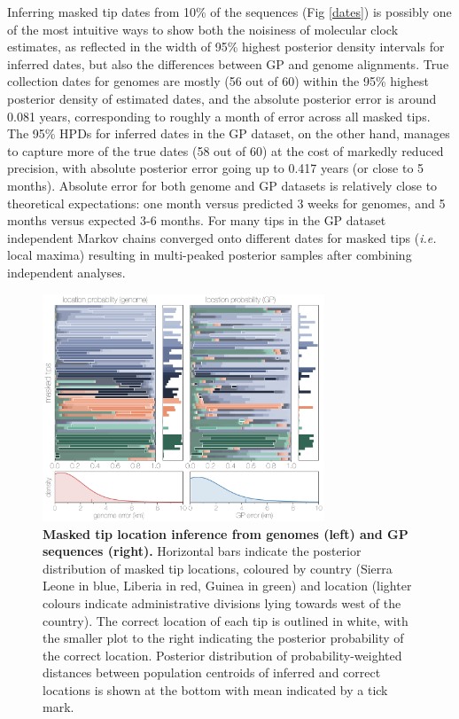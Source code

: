 \documentclass[11pt,oneside,letterpaper]{article}
\begin{document}
Inferring masked tip dates from 10\% of the sequences (Fig \ref{dates}) is possibly one of the most intuitive ways to show both the noisiness of molecular clock estimates, as reflected in the width of 95\% highest posterior density intervals for inferred dates, but also the differences between GP and genome alignments.
True collection dates for genomes are mostly (56 out of 60) within the 95\% highest posterior density of estimated dates, and the absolute posterior error is around 0.081 years, corresponding to roughly a month of error across all masked tips.
The 95\% HPDs for inferred dates in the GP dataset, on the other hand, manages to capture more of the true dates (58 out of 60) at the cost of markedly reduced precision, with absolute posterior error going up to 0.417 years (or close to 5 months).
Absolute error for both genome and GP datasets is relatively close to theoretical expectations: one month versus predicted 3 weeks for genomes, and 5 months versus expected 3-6 months.
For many tips in the GP dataset independent Markov chains converged onto different dates for masked tips (\textit{i.e.} local maxima) resulting in multi-peaked posterior samples after combining independent analyses.

\begin{figure}[h]
 \centering
	\includegraphics[width=0.75\textwidth]{figures/fig3_locations.png}
	\caption{\textbf{Masked tip location inference from genomes (left) and GP sequences (right).}
  Horizontal bars indicate the posterior distribution of masked tip locations, coloured by country (Sierra Leone in blue, Liberia in red, Guinea in green) and location (lighter colours indicate administrative divisions lying towards west of the country).
  The correct location of each tip is outlined in white, with the smaller plot to the right indicating the posterior probability of the correct location.
  Posterior distribution of probability-weighted distances between population centroids of inferred and correct locations is shown at the bottom with mean indicated by a tick mark.
	}
	\label{locations}
\end{figure}
\end{document}
